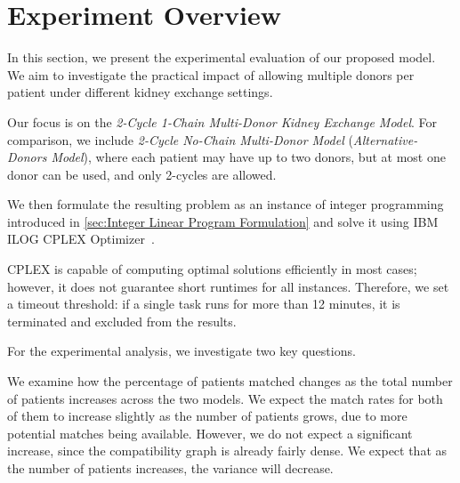 \section{Experiment Overview}

In this section, we present the experimental evaluation of our proposed model. We aim to investigate the practical impact of allowing multiple donors per patient under different kidney exchange settings.

Our focus is on the \textit{2-Cycle 1-Chain Multi-Donor Kidney Exchange Model}. For comparison, we include \textit{2-Cycle No-Chain Multi-Donor Model} (\textit{Alternative-Donors Model}), where each patient may have up to two donors, but at most one donor can be used, and only 2-cycles are allowed.

We then formulate the resulting problem as an instance of integer programming introduced in \autoref{sec:Integer Linear Program Formulation} and solve it using IBM ILOG CPLEX Optimizer~\cite{cplex}.

CPLEX is capable of computing optimal solutions efficiently in most cases; however, it does not guarantee short runtimes for all instances. Therefore, we set a timeout threshold: if a single task runs for more than 12 minutes, it is terminated and excluded from the results.


For the experimental analysis, we investigate two key questions.
\begin{experiment}
    \label{exp:percentage_vs_number_of_patients}
    \textup{We examine how the percentage of patients matched changes as the total number of patients increases across the two models. We expect the match rates for both of them to increase slightly as the number of patients grows, due to more potential matches being available. However, we do not expect a significant increase, since the compatibility graph is already fairly dense. We expect that as the number of patients increases, the variance will decrease.}
\end{experiment}




